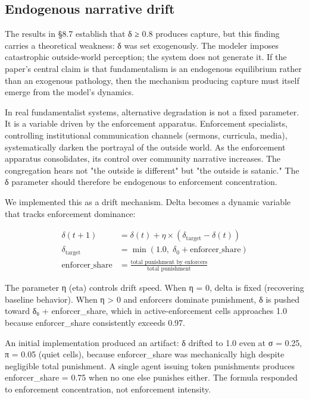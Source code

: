 \documentclass[12pt]{article}
\begin{document}
%
\subsection{Endogenous narrative drift}

The results in §8.7 establish that δ ≥ 0.8 produces capture, but this finding carries a theoretical weakness: δ was set exogenously. The modeler imposes catastrophic outside-world perception; the system does not generate it. If the paper's central claim is that fundamentalism is an endogenous equilibrium rather than an exogenous pathology, then the mechanism producing capture must itself emerge from the model's dynamics.

In real fundamentalist systems, alternative degradation is not a fixed parameter. It is a variable driven by the enforcement apparatus. Enforcement specialists, controlling institutional communication channels (sermons, curricula, media), systematically darken the portrayal of the outside world. As the enforcement apparatus consolidates, its control over community narrative increases. The congregation hears not "the outside is different" but "the outside is satanic." The δ parameter should therefore be endogenous to enforcement concentration.

We implemented this as a drift mechanism. Delta becomes a dynamic variable that tracks enforcement dominance:


\begin{align*}
\delta(t+1) &= \delta(t) + \eta \times (\delta_{\text{target}} - \delta(t)) \\
\delta_{\text{target}} &= \min(1.0,\; \delta_0 + \text{enforcer\_share}) \\
\text{enforcer\_share} &= \frac{\text{total punishment by enforcers}}{\text{total punishment}}
\end{align*}


The parameter η (eta) controls drift speed. When η = 0, delta is fixed (recovering baseline behavior). When η > 0 and enforcers dominate punishment, δ is pushed toward δ₀ + enforcer\_share, which in active-enforcement cells approaches 1.0 because enforcer\_share consistently exceeds 0.97.

An initial implementation produced an artifact: δ drifted to 1.0 even at σ = 0.25, π = 0.05 (quiet cells), because enforcer\_share was mechanically high despite negligible total punishment. A single agent issuing token punishments produces enforcer\_share = 0.75 when no one else punishes either. The formula responded to enforcement concentration, not enforcement intensity.
\end{document}
